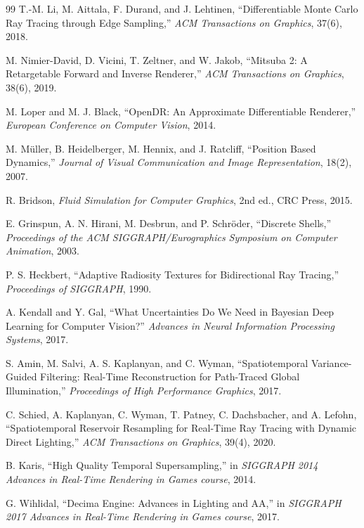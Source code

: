 \documentclass[11pt,letterpaper]{article}
\theoremstyle{gcresult}
\theoremstyle{definition}
\begin{document}
\begin{thebibliography}{99}
T.-M. Li, M. Aittala, F. Durand, and J. Lehtinen,
``Differentiable Monte Carlo Ray Tracing through Edge Sampling,''
\emph{ACM Transactions on Graphics}, 37(6), 2018.

M. Nimier-David, D. Vicini, T. Zeltner, and W. Jakob,
``Mitsuba 2: A Retargetable Forward and Inverse Renderer,''
\emph{ACM Transactions on Graphics}, 38(6), 2019.

M. Loper and M. J. Black,
``OpenDR: An Approximate Differentiable Renderer,''
\emph{European Conference on Computer Vision}, 2014.

M. M\"uller, B. Heidelberger, M. Hennix, and J. Ratcliff,
``Position Based Dynamics,''
\emph{Journal of Visual Communication and Image Representation}, 18(2), 2007.

R. Bridson,
\emph{Fluid Simulation for Computer Graphics},
2nd ed., CRC Press, 2015.

E. Grinspun, A. N. Hirani, M. Desbrun, and P. Schr\"oder,
``Discrete Shells,''
\emph{Proceedings of the ACM SIGGRAPH/Eurographics Symposium on Computer Animation}, 2003.

P. S. Heckbert,
``Adaptive Radiosity Textures for Bidirectional Ray Tracing,''
\emph{Proceedings of SIGGRAPH}, 1990.

A. Kendall and Y. Gal,
``What Uncertainties Do We Need in Bayesian Deep Learning for Computer Vision?''
\emph{Advances in Neural Information Processing Systems}, 2017.

S. Amin, M. Salvi, A. S. Kaplanyan, and C. Wyman,
``Spatiotemporal Variance-Guided Filtering: Real-Time Reconstruction for Path-Traced Global Illumination,''
\emph{Proceedings of High Performance Graphics}, 2017.

C. Schied, A. Kaplanyan, C. Wyman, T. Patney, C. Dachsbacher, and A. Lefohn,
``Spatiotemporal Reservoir Resampling for Real-Time Ray Tracing with Dynamic Direct Lighting,''
\emph{ACM Transactions on Graphics}, 39(4), 2020.

B. Karis,
``High Quality Temporal Supersampling,''
in \emph{SIGGRAPH 2014 Advances in Real-Time Rendering in Games course}, 2014.

G. Wihlidal,
``Decima Engine: Advances in Lighting and AA,''
in \emph{SIGGRAPH 2017 Advances in Real-Time Rendering in Games course}, 2017.

\end{thebibliography}
\end{document}
